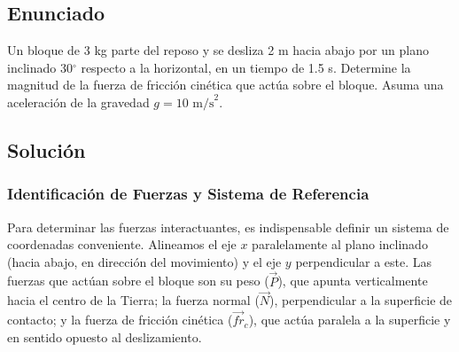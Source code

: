 \documentclass[12pt]{article}
\begin{document}
\newpage

\subsection*{Enunciado}
Un bloque de 3 kg parte del reposo y se desliza 2 m hacia abajo por un plano inclinado 30$^\circ$ respecto a la horizontal, en un tiempo de 1.5 s. Determine la magnitud de la fuerza de fricción cinética que actúa sobre el bloque. Asuma una aceleración de la gravedad $g = 10 \text{ m/s}^2$.

\subsection*{Solución}

\subsubsection*{Identificación de Fuerzas y Sistema de Referencia}
Para determinar las fuerzas interactuantes, es indispensable definir un sistema de coordenadas conveniente. Alineamos el eje $x$ paralelamente al plano inclinado (hacia abajo, en dirección del movimiento) y el eje $y$ perpendicular a este. Las fuerzas que actúan sobre el bloque son su peso ($\vec{P}$), que apunta verticalmente hacia el centro de la Tierra; la fuerza normal ($\vec{N}$), perpendicular a la superficie de contacto; y la fuerza de fricción cinética ($\vec{fr}_c$), que actúa paralela a la superficie y en sentido opuesto al deslizamiento.
\end{document}
